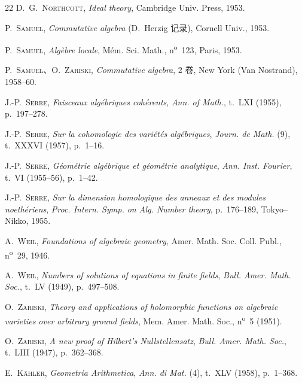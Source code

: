 \documentclass[UTF8,fontset=none,11pt,oneside,openany]{ctexbook}
\newcommand{\oldpage}[2][]{%
  \hypertarget{ega-source-page-#1-#2}{}%
  \marginnote{\scriptsize\textbf{#1}~|~#2}\ignorespaces}
\begin{document}
\begin{thebibliography}{22}
D.~G.~\textsc{Northcott}, \emph{Ideal theory}, Cambridge Univ. Press, 1953.

P.~\textsc{Samuel}, \emph{Commutative algebra} (D.~Herzig 记录), Cornell
Univ., 1953.

P.~\textsc{Samuel}, \emph{Algèbre locale}, Mém. Sci. Math.,
n\textsuperscript{o}~123, Paris, 1953.

P.~\textsc{Samuel}、O.~\textsc{Zariski},
\emph{Commutative algebra}, 2 卷, New York (Van Nostrand), 1958--60.

J.-P.~\textsc{Serre}, \emph{Faisceaux algébriques cohérents},
\emph{Ann. of Math.}, t.~LXI (1955), p.~197--278.

J.-P.~\textsc{Serre},
\emph{Sur la cohomologie des variétés algébriques},
\emph{Journ. de Math.} (9), t.~XXXVI (1957), p.~1--16.

J.-P.~\textsc{Serre},
\emph{Géométrie algébrique et géométrie analytique},
\emph{Ann. Inst. Fourier}, t.~VI (1955--56), p.~1--42.

J.-P.~\textsc{Serre},
\emph{Sur la dimension homologique des anneaux et des modules noethériens},
\emph{Proc. Intern. Symp. on Alg. Number theory}, p.~176--189, Tokyo--Nikko,
1955.

A.~\textsc{Weil}, \emph{Foundations of algebraic geometry}, Amer. Math. Soc.
Coll. Publ., n\textsuperscript{o}~29, 1946.

A.~\textsc{Weil}, \emph{Numbers of solutions of equations in finite fields},
\emph{Bull. Amer. Math. Soc.}, t.~LV (1949), p.~497--508.

O.~\textsc{Zariski},
\emph{Theory and applications of holomorphic functions on algebraic varieties
over arbitrary ground fields}, Mem. Amer. Math. Soc., n\textsuperscript{o}~5
(1951).

O.~\textsc{Zariski}, \emph{A new proof of Hilbert's Nullstellensatz},
\emph{Bull. Amer. Math. Soc.}, t.~LIII (1947), p.~362--368.

E.~\textsc{Kähler}, \emph{Geometria Arithmetica},
\emph{Ann. di Mat.} (4), t.~XLV (1958), p.~1--368.

\end{thebibliography}
\clearpage
\oldpage[I]{217}
\end{document}
